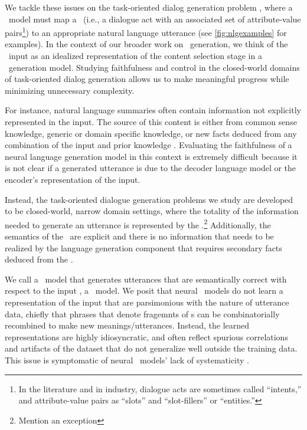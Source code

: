 We tackle these issues on the task-oriented dialog generation problem
\citep{mairesse2010,wen2015,dusek2018}, where a
\naturallanguagegeneration~model must map a \meaningrepresentation~(i.e., a
dialogue act with an associated set of attribute-value pairs\footnote{In the
literature and in industry, dialogue acts are sometimes called ``intents,''
and attribute-value pairs as ``slots'' and ``slot-fillers'' or ``entities.''})
to an appropriate natural language utterance (see \autoref{fig:nlgexamples}
for examples).  In the context of our broader work on \texttotext~generation,
we think of the \meaningrepresentation~input as an idealized representation of
the content selection stage in a \texttotext~generation model.  Studying
faithfulness and control in the closed-world domains of task-oriented dialog
generation allows us to make meaningful progress while minimizing unnecessary
complexity.

For instance, natural language summaries often contain information not
explicitly represented in the input. The source of this content is either from
common sense knowledge, generic or domain specific knowledge, or new facts
deduced from any combination of the input and prior knowledge
\citep{wiseman2017,wang2019}.  Evaluating the faithfulness of a neural language
generation model in this context is extremely difficult because it is not
clear if a generated utterance is due to the decoder language model or 
the encoder's representation of the input.

Instead, the task-oriented dialogue generation problems we study are developed
to be closed-world, narrow domain settings, where the totality of the
information needed to generate an utterance is represented by the
\meaningrepresentation.\footnote{Mention an exception} Additionally, the
semantics of the \meaningrepresentation~are explicit and there is no
information that needs to be realized by the language generation component
that requires secondary facts deduced from the \meaningrepresentation.

We call a \naturallanguagegeneration~model that generates utterances 
that are semantically correct with respect to the input 
\meaningrepresentation, a \faithfulgeneration~model.
We posit that neural \sequencetosequence~models do not learn a representation
of the input that are parsimonious with the nature of utterance data, chiefly
that phrases that denote fragemnts of \meaningrepresentation s can be combinatorially
recombined to make new meanings/utterances. Instead, the learned representations are highly idiosyncratic, and often reflect spurious correlations and 
artifacts of the dataset that do not generalize well outside the training data.
This issue is symptomatic of neural
\sequencetosequence~models' lack of systematicity \citep{lake18}.


